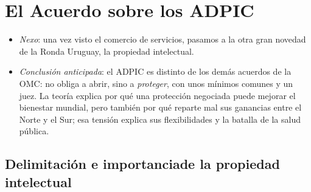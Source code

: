 \documentclass[11pt]{article}
\begin{document}
\section{El Acuerdo sobre los ADPIC}\label{sec:adpic}

\begin{itemize}
\item \emph{Nexo}: una vez visto el comercio de servicios, pasamos a la otra gran novedad de la Ronda Uruguay, la propiedad intelectual.
\item \emph{Conclusión anticipada}: el ADPIC es distinto de los demás acuerdos de la OMC: no obliga a abrir, sino a \emph{proteger}, con unos mínimos comunes y un juez. La teoría explica por qué una protección negociada puede mejorar el bienestar mundial, pero también por qué reparte mal sus ganancias entre el Norte y el Sur; esa tensión explica sus flexibilidades y la batalla de la salud pública.
\end{itemize}

\subsection{Delimitación e importancia\cortetitulo de la propiedad intelectual}\label{sec:pi-importancia}
\end{document}
